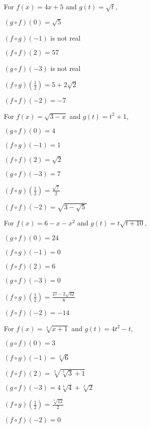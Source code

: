 \begin{exenum}
\item  For $f(x) = 4x+5$ and $g(t) = \sqrt{t}$,
\begin{shortitemize}[MMMMMMMMMMM]
\item  $(g\circ f)(0) = \sqrt{5}$
\item  $(f\circ g)(-1)$ is not real
\item  $(f \circ f)(2) = 57$
\item  $(g\circ f)(-3)$ is not real
\item  $(f\circ g)\left(\frac{1}{2}\right) = 5+2\sqrt{2}$
\item  $(f \circ f)(-2) = -7$
\end{shortitemize}

\item  For $f(x) = \sqrt{3-x}$ and $g(t) = t^2+1$,
\begin{shortitemize}[MMMMMMMMMMM]
\item  $(g\circ f)(0) = 4$
\item  $(f\circ g)(-1) = 1$
\item  $(f \circ f)(2) = \sqrt{2}$
\item  $(g\circ f)(-3) = 7$
\item  $(f\circ g)\left(\frac{1}{2}\right) = \frac{\sqrt{7}}{2}$
\item  $(f \circ f)(-2) = \sqrt{3 - \sqrt{5}}$
\end{shortitemize}

\item  For  $f(x) = 6-x-x^2$ and $g(t) = t\sqrt{t+10}$,
\begin{shortitemize}[MMMMMMMMMMM]
\item  $(g\circ f)(0) = 24$
\item  $(f\circ g)(-1) = 0$
\item  $(f \circ f)(2) = 6$
\item  $(g\circ f)(-3) = 0$
\item  $(f\circ g)\left(\frac{1}{2}\right) = \frac{27-2\sqrt{42}}{8}$
\item  $(f \circ f)(-2) = -14$
\end{shortitemize}

\item  For  $f(x) = \sqrt[3]{x+1}$ and $g(t) = 4t^2-t$,
\begin{shortitemize}[MMMMMMMMMMM]
\item  $(g\circ f)(0) = 3$
\item  $(f\circ g)(-1) = \sqrt[3]{6}$
\item  $(f \circ f)(2) = \sqrt[3]{\sqrt[3]{3}+1}$
\item  $(g\circ f)(-3) = 4\sqrt[3]{4}+\sqrt[3]{2}$
\item  $(f\circ g)\left(\frac{1}{2}\right) = \frac{\sqrt[3]{12}}{2}$
\item  $(f \circ f)(-2) = 0$
\end{shortitemize}


\end{exenum}

